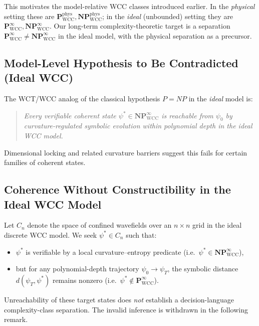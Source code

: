 \documentclass[12pt]{article}
\theoremstyle{remark}
\begin{document}
This motivates the model-relative WCC classes introduced earlier. In the
\emph{physical} setting these are
\( \mathbf{P}_{\mathrm{WCC}}^{\mathrm{phys}},
   \mathbf{NP}_{\mathrm{WCC}}^{\mathrm{phys}} \);
in the \emph{ideal} (unbounded) setting they are
\( \mathbf{P}_{\mathrm{WCC}}^{\infty},
   \mathbf{NP}_{\mathrm{WCC}}^{\infty} \).
Our long-term complexity-theoretic target is a separation
\(
\mathbf{P}_{\mathrm{WCC}}^{\infty} \neq
\mathbf{NP}_{\mathrm{WCC}}^{\infty}
\)
in the ideal model, with the physical separation as a precursor.

\subsection{Model-Level Hypothesis to Be Contradicted (Ideal WCC)}

The WCT/WCC analog of the classical hypothesis $P = NP$ in the \emph{ideal}
model is:

\begin{quote}
\emph{Every verifiable coherent state $\psi^* \in
\mathbf{NP}_{\mathrm{WCC}}^{\infty}$ is
reachable from $\psi_0$ by curvature-regulated symbolic evolution within
polynomial depth in the ideal WCC model.}
\end{quote}

Dimensional locking and related curvature barriers suggest this fails for
certain families of coherent states.

\subsection{Coherence Without Constructibility in the Ideal WCC Model}

Let $C_n$ denote the space of confined wavefields over an $n \times n$ grid
in the ideal discrete WCC model. We seek $\psi^* \in C_n$ such that:

\begin{itemize}
  \item $\psi^*$ is verifiable by a local curvature–entropy predicate  
        (i.e.\ $\psi^* \in \mathbf{NP}_{\mathrm{WCC}}^{\infty}$),
  \item but for any polynomial-depth trajectory $\psi_0 \to \psi_T$,  
        the symbolic distance $d(\psi_T, \psi^*)$ remains nonzero  
        (i.e.\ $\psi^* \notin \mathbf{P}_{\mathrm{WCC}}^{\infty}$).
\end{itemize}

Unreachability of these target states does \emph{not}
establish a decision-language complexity-class separation.
The invalid inference is withdrawn in the following remark.
\end{document}
